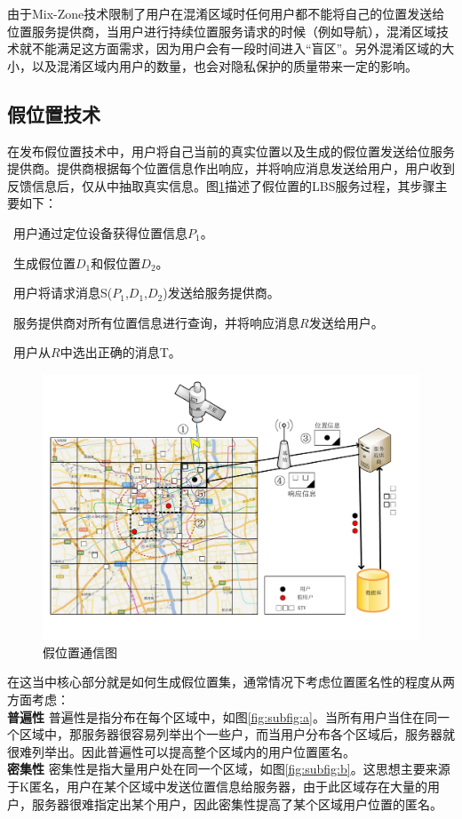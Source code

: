 由于Mix-Zone技术限制了用户在混淆区域时任何用户都不能将自己的位置发送给位置服务提供商，当用户进行持续位置服务请求的时候（例如导航），混淆区域技术就不能满足这方面需求，因为用户会有一段时间进入“盲区”。另外混淆区域的大小，以及混淆区域内用户的数量，也会对隐私保护的质量带来一定的影响。

\subsection{假位置技术}
在发布假位置技术中，用户将自己当前的真实位置以及生成的假位置发送给位服务提供商。提供商根据每个位置信息作出响应，并将响应消息发送给用户，用户收到反馈信息后，仅从中抽取真实信息。图\ref{fig:Dummy_pdf}描述了假位置的LBS服务过程，其步骤主要如下：	

~用户通过定位设备获得位置信息$P_1$。

~生成假位置$D_1$和假位置$D_2$。

~用户将请求消息S($P_1$,$D_1$,$D_2$)发送给服务提供商。

~服务提供商对所有位置信息进行查询，并将响应消息$R$发送给用户。

~用户从$R$中选出正确的消息T。
\begin{figure}[H]
\centering
\includegraphics[width=14 cm]{fig/Dummy.pdf}
\caption{假位置通信图} %
\label{fig:Dummy_pdf}
\end{figure}
在这当中核心部分就是如何生成假位置集，通常情况下考虑位置匿名性的程度从两方面考虑：\\
\textbf {普遍性} 普遍性是指分布在每个区域中，如图\ref{fig:subfig:a}。当所有用户当住在同一个区域中，那服务器很容易列举出个一些户，而当用户分布各个区域后，服务器就很难列举出。因此普遍性可以提高整个区域内的用户位置匿名。\\
\textbf {密集性} 密集性是指大量用户处在同一个区域，如图\ref{fig:subfig:b}。这思想主要来源于K匿名，用户在某个区域中发送位置信息给服务器，由于此区域存在大量的用户，服务器很难指定出某个用户，因此密集性提高了某个区域用户位置的匿名。


